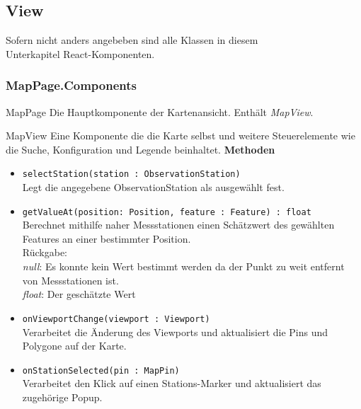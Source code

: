 \subsection{View}
Sofern nicht anders angebeben sind alle Klassen in diesem 
\\Unterkapitel React-Komponenten.
\subsubsection{MapPage.Components}
    \begin{Class}{MapPage}
        Die Hauptkomponente der Kartenansicht. Enthält \emph{MapView}.
    \end{Class}
    \begin{Class}{MapView}
        Eine Komponente die die Karte selbst und weitere Steuerelemente wie die Suche, Konfiguration und Legende beinhaltet.
        \textbf{Methoden}
        \begin{itemize}
            \item \texttt{selectStation(station : ObservationStation)}
            \\ Legt die angegebene ObservationStation als ausgewählt fest.
            \item \texttt{getValueAt(position: Position, feature : Feature) : float}
            \\ Berechnet mithilfe naher Messstationen einen Schätzwert des gewählten Features an einer bestimmter Position.
            \\ Rückgabe:
            \\ \emph{null}: Es konnte kein Wert bestimmt werden da der Punkt zu weit entfernt von Messstationen ist.
            \\ \emph{float}: Der geschätzte Wert
            \item \texttt{onViewportChange(viewport : Viewport)}
            \\ Verarbeitet die Änderung des Viewports und aktualisiert die Pins und Polygone auf der Karte.
            \item \texttt{onStationSelected(pin : MapPin)}
            \\ Verarbeitet den Klick auf einen Stations-Marker und aktualisiert das zugehörige Popup.
        \end{itemize}
    \end{Class}

